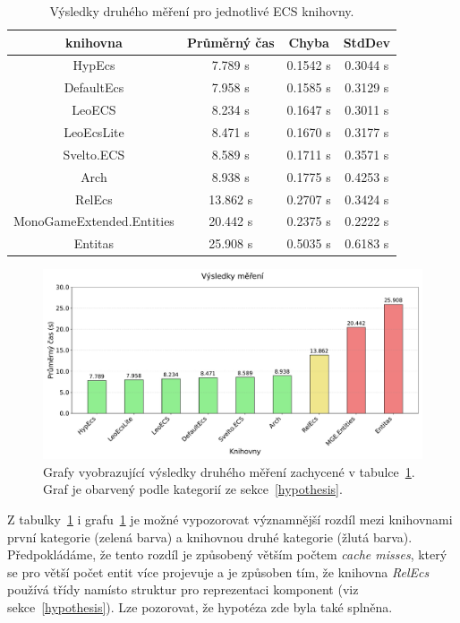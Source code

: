 \begin{table}[!htb]
    \centering\footnotesize\sf
    \begin{tabular}{c c c c}
        \toprule
        knihovna & Průměrný čas & Chyba & StdDev \\
        \midrule
        HypEcs & 7.789 s & 0.1542 s & 0.3044 s \\
        DefaultEcs & 7.958 s & 0.1585 s & 0.3129 s \\
        LeoECS & 8.234 s & 0.1647 s & 0.3011 s \\
        LeoEcsLite & 8.471 s & 0.1670 s & 0.3177 s \\
        Svelto.ECS & 8.589 s & 0.1711 s & 0.3571 s \\
        Arch & 8.938 s & 0.1775 s & 0.4253 s \\
        RelEcs & 13.862 s & 0.2707 s & 0.3424 s \\
        MonoGameExtended.Entities & 20.442 s & 0.2375 s & 0.2222 s \\
        Entitas & 25.908 s & 0.5035 s & 0.6183 s \\
        \bottomrule
    \end{tabular}
    \caption{Výsledky druhého měření pro jednotlivé ECS knihovny.}
    \label{tab:second-benchmark-results}
\end{table}

\begin{figure}[!htb]
    \centering
    \includegraphics[width=1.0\linewidth]{plots/second_benchmark_results.pdf}
    \caption{Grafy vyobrazující výsledky druhého měření zachycené v tabulce~\ref{tab:second-benchmark-results}. Graf je obarvený podle kategorií ze sekce~\ref{hypothesis}.}
    \label{fig:second-benchmark-results}
\end{figure}

Z tabulky~\ref{tab:second-benchmark-results} i grafu~\ref{fig:second-benchmark-results} je možné vypozorovat významnější rozdíl mezi knihovnami první kategorie (zelená barva) a knihovnou druhé kategorie (žlutá barva). Předpokládáme, že tento rozdíl je způsobený větším počtem \textit{cache misses}, který se pro větší počet entit více projevuje a je způsoben tím, že knihovna \textit{RelEcs} používá třídy namísto struktur pro reprezentaci komponent (viz sekce~\ref{hypothesis}). Lze pozorovat, že hypotéza zde byla také splněna.

